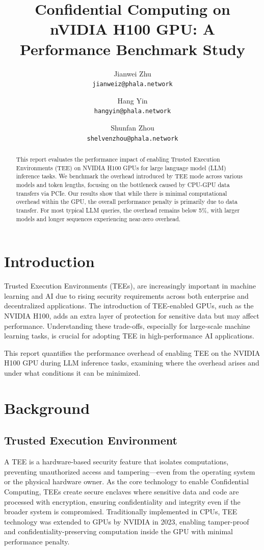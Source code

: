 \documentclass{article}
\title{Confidential Computing on nVIDIA H100 GPU: A Performance Benchmark Study}
\author{
  Jianwei Zhu \\
  \texttt{jianweiz@phala.network}
  \and
  Hang Yin \\
  \texttt{hangyin@phala.network}
  \and
  Shunfan Zhou \\
  \texttt{shelvenzhou@phala.network}
}
\begin{document}
\maketitle

\begin{abstract}
This report evaluates the performance impact of enabling Trusted Execution Environments (TEE) on NVIDIA H100 GPUs for large language model (LLM) inference tasks. We benchmark the overhead introduced by TEE mode across various models and token lengths, focusing on the bottleneck caused by CPU-GPU data transfers via PCIe. Our results show that while there is minimal computational overhead within the GPU, the overall performance penalty is primarily due to data transfer. For most typical LLM queries, the overhead remains below 5\%, with larger models and longer sequences experiencing near-zero overhead.
\end{abstract}

\section{Introduction}

Trusted Execution Environments (TEEs), are increasingly important in machine learning and AI due to rising security requirements across both enterprise and decentralized applications. The introduction of TEE-enabled GPUs, such as the NVIDIA H100, adds an extra layer of protection for sensitive data but may affect performance. Understanding these trade-offs, especially for large-scale machine learning tasks, is crucial for adopting TEE in high-performance AI applications.

This report quantifies the performance overhead of enabling TEE on the NVIDIA H100 GPU during LLM inference tasks, examining where the overhead arises and under what conditions it can be minimized.

\section{Background}

\subsection{Trusted Execution Environment}

A TEE is a hardware-based security feature that isolates computations, preventing unauthorized access and tampering—even from the operating system or the physical hardware owner. As the core technology to enable Confidential Computing, TEEs create secure enclaves where sensitive data and code are processed with encryption, ensuring confidentiality and integrity even if the broader system is compromised. Traditionally implemented in CPUs, TEE technology was extended to GPUs by NVIDIA in 2023, enabling tamper-proof and confidentiality-preserving computation inside the GPU with minimal performance penalty.
\end{document}
